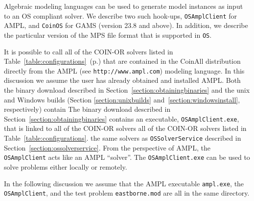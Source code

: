 \ifdevelop
{}\label{section:modellang}
\else
{}\label{section:modellang}
\fi

Algebraic modeling languages can be used to generate model instances as input to an OS compliant solver.
We describe two such hook-ups, {\tt OSAmplClient} for AMPL, and {\tt CoinOS} for
GAMS (version 23.8 and above). In addition, we describe the particular version of the 
MPS file format that is supported in {\tt OS}.


\label{section:amplclient}





It is possible to call all of the COIN-OR solvers 
\ifdevelop
listed in %
Table~\ref{table:configurations}~(p.\pageref{table:configurations})
\else
that are contained in the CoinAll distribution
\fi
directly from the  AMPL (see {\tt http://www.ampl.com}) modeling language.  In this discussion we assume 
the user has already obtained and installed AMPL.
\ifdevelop  
Both the binary download described in Section~\ref{section:obtainingbinaries}
and the unix and Windows builds (Section \ref{section:unixbuilds}
and~\ref{section:windowsinstall}, respectively) contain
\else
The binary download described in Section~\ref{section:obtainingbinaries}
contains
\fi
an executable, {\tt OSAmplClient.exe},
that is linked to all of the COIN-OR solvers 
\ifdevelop
all of the COIN-OR solvers listed in Table~\ref{table:configurations}. %
\else
the same solvers as {\tt OSSolverService} described in Section~\ref{section:ossolverservice}.
\fi
From the  perspective of AMPL, the   {\tt OSAmplClient} acts like an AMPL ``solver''.    
The {\tt OSAmplClient.exe}   can be used to solve problems either locally or remotely.   


\label{section:localampl}

In the following discussion we assume that the AMPL executable {\tt ampl.exe}, the {\tt OSAmplClient},  
and the test problem {\tt  eastborne.mod}
 are all in the same directory.  


